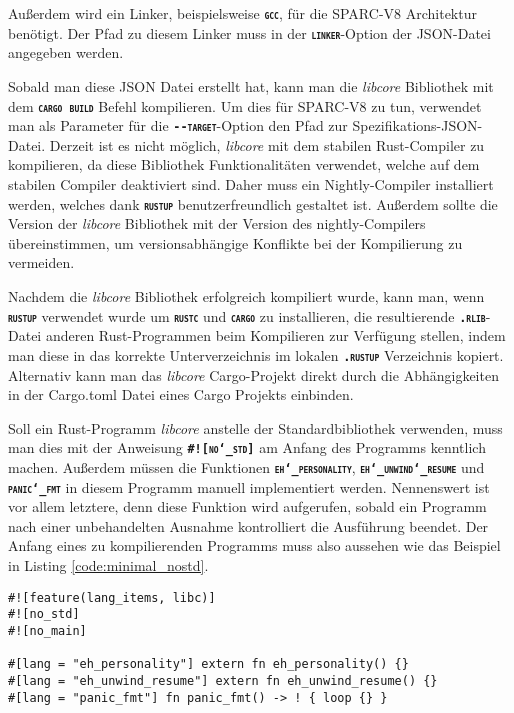 Außerdem wird ein Linker, beispielsweise \texttt{\textsc{\textbf{gcc}}},
für die SPARC-V8 Architektur benötigt. Der Pfad zu diesem Linker
muss in der \texttt{\textsc{\textbf{linker}}}-Option der JSON-Datei angegeben werden.

Sobald man diese JSON Datei erstellt hat, kann man die \textit{libcore} Bibliothek mit dem
\texttt{\textsc{\textbf{cargo build}}} Befehl kompilieren.
Um dies für SPARC-V8 zu tun, verwendet man als Parameter für die \texttt{\textsc{\textbf{-{}-target}}}-Option
den Pfad zur Spezifikations-JSON-Datei.
Derzeit ist es nicht möglich, \textit{libcore} mit dem stabilen Rust-Compiler zu kompilieren,
da diese Bibliothek Funktionalitäten verwendet, welche auf dem stabilen Compiler deaktiviert sind.
Daher muss ein Nightly-Compiler installiert werden, welches
dank \texttt{\textsc{\textbf{rustup}}} benutzerfreundlich gestaltet ist.
Außerdem sollte die Version der \textit{libcore} Bibliothek
mit der Version des nightly-Compilers übereinstimmen,
um versionsabhängige Konflikte bei der Kompilierung zu vermeiden.

Nachdem die \textit{libcore} Bibliothek erfolgreich kompiliert wurde, kann man,
wenn \texttt{\textsc{\textbf{rustup}}} verwendet wurde um \texttt{\textsc{\textbf{rustc}}} und
\texttt{\textsc{\textbf{cargo}}} zu installieren, 
die resultierende \texttt{\textsc{\textbf{.rlib}}}-Datei anderen Rust-Programmen
beim Kompilieren zur Verfügung stellen,
indem man diese in das korrekte Unterverzeichnis im lokalen \texttt{\textsc{\textbf{.rustup}}} Verzeichnis kopiert.
Alternativ kann man das \textit{libcore} Cargo-Projekt direkt durch die Abhängigkeiten in der Cargo.toml Datei
eines Cargo Projekts einbinden.

Soll ein Rust-Programm \textit{libcore} anstelle der Standardbibliothek verwenden, muss man dies
mit der Anweisung \texttt{\textsc{\textbf{\#![no\char`_std]}}}
am Anfang des Programms kenntlich machen.
Außerdem müssen die Funktionen \texttt{\textsc{\textbf{eh\char`_personality}}},
\texttt{\textsc{\textbf{eh\char`_unwind\char`_resume}}} und
\texttt{\textsc{\textbf{panic\char`_fmt}}} in diesem Programm manuell implementiert werden.
Nennenswert ist vor allem letztere, denn diese Funktion
wird aufgerufen, sobald ein Programm nach einer unbehandelten Ausnahme kontrolliert die Ausführung beendet.
Der Anfang eines zu kompilierenden Programms muss also aussehen wie das Beispiel in Listing \ref{code:minimal_nostd}.

\begin{lstlisting}[float,caption={
Der Beginn eines Rust-Programms, welches nicht die Standardbibliothek verwendet.
},label=code:minimal_nostd]
#![feature(lang_items, libc)]
#![no_std]
#![no_main]

#[lang = "eh_personality"] extern fn eh_personality() {}
#[lang = "eh_unwind_resume"] extern fn eh_unwind_resume() {}
#[lang = "panic_fmt"] fn panic_fmt() -> ! { loop {} }
\end{lstlisting}

